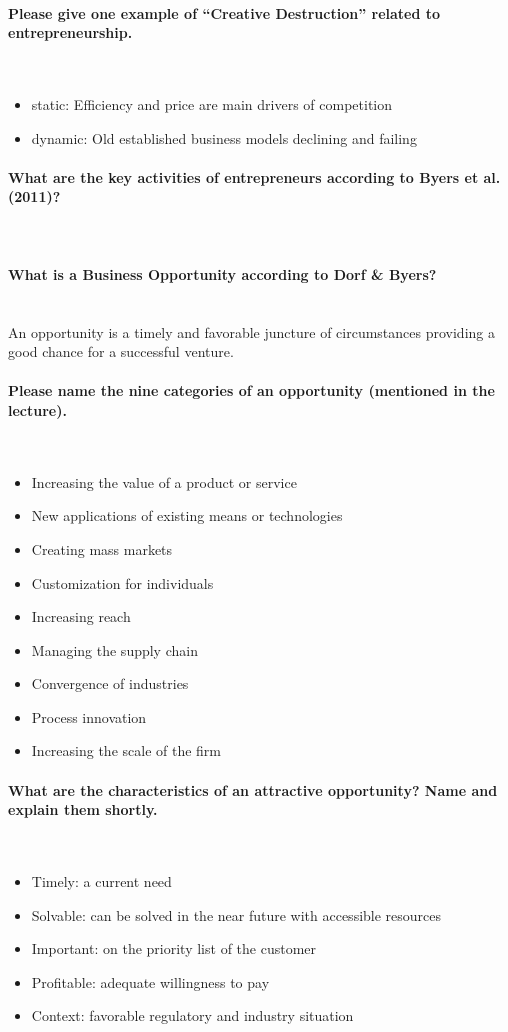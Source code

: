 \documentclass[10pt,a4paper,noendnumber=true]{scrartcl}
\newcommand{\properparagraph}[1]{\paragraph{\textcolor{Emerald}{#1}}\mbox{}\\}
\begin{document}
\properparagraph{Please give one example of “Creative Destruction” related to entrepreneurship.}
\begin{itemize}
	\item static: Efficiency and price are main drivers of competition
	\item dynamic: Old established business models declining and failing	
\end{itemize}

\properparagraph{What are the key activities of entrepreneurs according to Byers et al. (2011)?}


\properparagraph{What is a Business Opportunity according to Dorf \& Byers?}
An opportunity is a timely and favorable juncture of circumstances providing a good chance for a successful venture.

\properparagraph{Please name the nine categories of an opportunity (mentioned in the lecture).}
\begin{itemize}
	\item Increasing the value of a product or service
	\item New applications of existing means or technologies
	\item Creating mass markets
	\item Customization for individuals
	\item Increasing reach
	\item Managing the supply chain
	\item Convergence of industries
	\item Process innovation
	\item Increasing the scale of the firm
\end{itemize}

\properparagraph{What are the characteristics of an attractive opportunity? Name and explain them shortly.}
\begin{itemize}
	\item Timely: a current need
	\item Solvable: can be solved in the near future with accessible resources
	\item Important: on the priority list of the customer
	\item Profitable: adequate willingness to pay
	\item Context: favorable regulatory and industry situation
	
\end{itemize}
\end{document}
